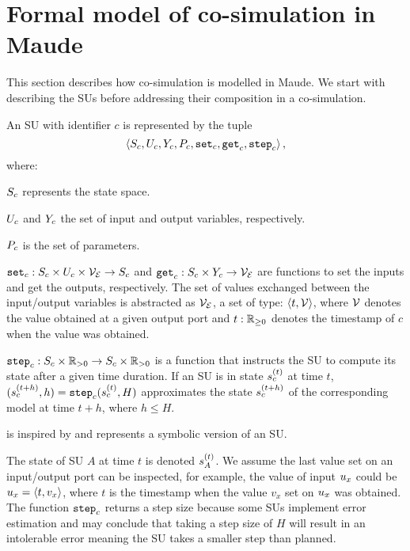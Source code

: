 \section{Formal model of co-simulation in Maude}
This section describes how co-simulation is modelled in Maude.
We start with describing the SUs before addressing their composition in a co-simulation.

\begin{definition}\label{def:fmu}
  An SU with identifier $c$ is represented by the tuple
  $$ \left\langle S_{c}, U_{c}, Y_{c}, P_{c}, \mathtt{set}_{c}, \mathtt{get}_{c}, \mathtt{step}_{c} \right\rangle ,$$
  where:
  \begin{compactitem}
    \item $S_{c}$ represents the state space.
    \item $U_{c}$ and $Y_{c}$ the set of input and output variables, respectively. 
    \item $P_{c}$ is the set of parameters.
    \item $\mathtt{set}_{c} : S_{c} \times U_{c} \times \mathcal{V_{E}} \to S_{c}$ and $\mathtt{get}_{c}: S_{c} \times Y_{c} \to \mathcal{V_{E}}$ are functions to set the inputs and get the outputs, respectively. The set of values exchanged between the input/output variables is abstracted as $\mathcal{V_{E}}$, a set of type: $ \left\langle t, \mathcal{V} \right\rangle $, where $\mathcal{V}$ denotes the value obtained at a given output port and $t: \mathbb{R}_{\geq 0}$ denotes the timestamp of $c$ when the value was obtained.
    \item $\mathtt{step}_{c}: S_{c} \times \mathbb{R}_{> 0} \to S_{c} \times \mathbb{R}_{> 0} $ is a function that instructs the SU to compute its state after a given time duration. If an SU is in state $s_{c}^{(t)}$ at time $t$, $(s_{c}^{(t+h)}, h) = \mathtt{step}_{c}(s_{c}^{(t)}, H)$ approximates the state $s_{c}^{(t+h)}$ of the corresponding model at time $t+h$, where $h \leq H$. 
  \end{compactitem}
\end{definition}

 is inspired by \cite{Broman2013,Gomes2019c,thrane2021} and represents a symbolic version of an SU. 

The state of SU $A$ at time $t$ is denoted $s_{A}^{(t)}$.
We assume the last value set on an input/output port can be inspected, for example, the value of input $u_{x}$ could be $u_{x} =  \left\langle t, v_x \right\rangle $, where $t$ is the timestamp when the value $v_x$ set on $u_{x}$ was obtained.
The function $\mathtt{step}_{c}$ returns a step size because some SUs implement error estimation and may conclude that taking a step size of $H$ will result in an intolerable error meaning the SU takes a smaller step than planned.

